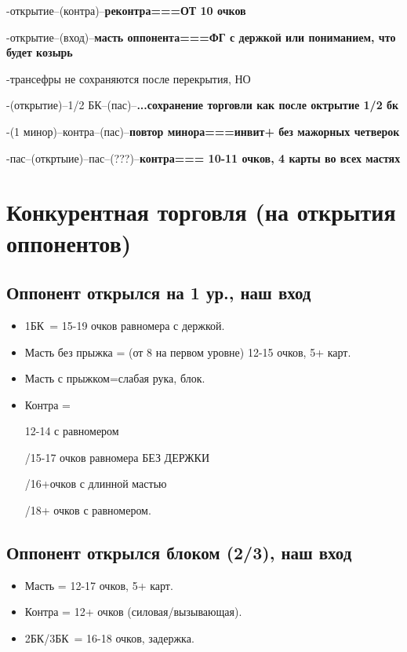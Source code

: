 \documentclass[a4paper,10pt]{article}
\newcommand{\NT}{БК}
\begin{document}
-открытие--(контра)--\textbf{реконтра===ОТ 10 очков}

-открытие--(вход)--\textbf{масть оппонента===ФГ с держкой или пониманием, что будет козырь}


-трансефры не сохраняются после перекрытия, НО

-(открытие)--1/2 БК--(пас)--\textbf{...сохранение торговли как после октрытие 1/2 бк}


-(1 минор)--контра--(пас)--\textbf{повтор минора===инвит+ без мажорных четверок}

-пас--(откртыие)--пас--(???)--\textbf{контра=== 10-11 очков, 4 карты во всех мастях}
\section{Конкурентная торговля (на открытия оппонентов)}
\subsection{Оппонент открылся на 1 ур., наш вход}
\begin{itemize}[label=\textcolor{sputnikRed}{\tiny\(\blacksquare\)}, noitemsep]
    \item 1\NT\ = 15-19 очков равномера с держкой.
    \item Масть без прыжка = (от 8 на первом уровне) 12-15 очков, 5+ карт.
    \item Масть с прыжком=слабая рука, блок.
    \item Контра =
    
     12-14 с равномером
    
    /15-17 очков равномера БЕЗ ДЕРЖКИ
    
    /16+очков с длинной мастью
    
    /18+ очков с равномером.
\end{itemize}

\subsection{Оппонент открылся блоком (2/3), наш вход}
\begin{itemize}[label=\textcolor{sputnikRed}{\tiny\(\blacksquare\)}, noitemsep]
    \item Масть = 12-17 очков, 5+ карт.
    \item Контра = 12+ очков (силовая/вызывающая).
    \item 2\NT/3\NT\ = 16-18 очков, задержка.
\end{itemize}
\end{document}
